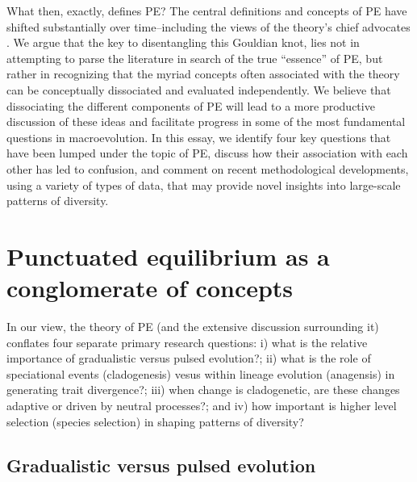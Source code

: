 What then, exactly, defines PE? The central definitions and concepts of PE have shifted substantially over time--including the views of the theory's chief advocates \citep{Mayr1982, Ruse1989, Sepkoskibook}. We argue that the key to disentangling this Gouldian knot, lies not in attempting to parse the literature in search of the true ``essence'' of PE, but rather in recognizing that the myriad concepts often associated with the theory can be conceptually dissociated and evaluated independently. We believe that dissociating the different components of PE will lead to a more productive discussion of these ideas and facilitate progress in some of the most fundamental questions in macroevolution. In this essay, we identify four key questions that have been lumped under the topic of PE, discuss how their association with each other has led to confusion, and comment on recent methodological developments, using a variety of types of data, that may provide novel insights into large-scale patterns of diversity.

\section{Punctuated equilibrium as a conglomerate of concepts}

In our view, the theory of PE (and the extensive discussion surrounding it) conflates four separate primary research questions: i) what is the relative importance of gradualistic versus pulsed evolution?; ii) what is the role of speciational events (cladogenesis) vesus within lineage evolution (anagensis) in generating trait divergence?; iii) when change is cladogenetic, are these changes adaptive or driven by neutral processes?; and iv) how important is higher level selection (species selection) in shaping patterns of diversity? 

\subsection{Gradualistic versus pulsed evolution}

